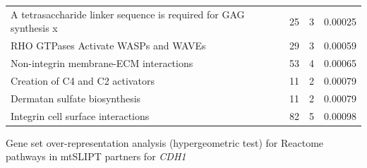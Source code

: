 \begin{table}[!ht]
{\begin{threeparttable}
\begin{tabular}{lccc}
  \rowcolor{black!10}
  A tetrasaccharide linker sequence is required for GAG synthesis \textcolor{black!10}{x} &  25 &   3 & 0.00025 \\ 
  \rowcolor{black!5}
  RHO GTPases Activate WASPs and WAVEs &  29 &   3 & 0.00059 \\ 
  \rowcolor{black!10}
  Non-integrin membrane-ECM interactions &  53 &   4 & 0.00065 \\ 
  \rowcolor{black!5}
  Creation of C4 and C2 activators &  11 &   2 & 0.00079 \\ 
  \rowcolor{black!10}
  Dermatan sulfate biosynthesis &  11 &   2 & 0.00079 \\ 
  \rowcolor{black!5}
  Integrin cell surface interactions &  82 &   5 & 0.00098 \\ 
  \hline
\end{tabular}
\begin{tablenotes}
\raggedright \small
Gene set over-representation analysis (hypergeometric test) for Reactome pathways in mtSLIPT partners for \textit{CDH1}
\end{tablenotes}
\end{threeparttable}
}
\end{table}

